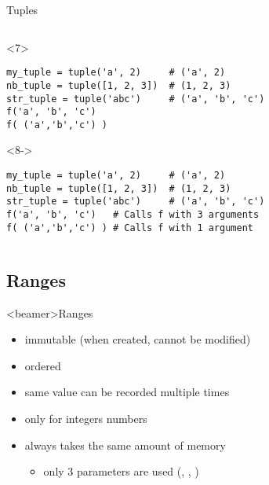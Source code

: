 \begin{frame}[fragile]{Tuples}
\begin{center}
\begin{columns}[onlytextwidth]
\begin{column}{\textwidth}
      \begin{onlyenv}<7>
        \begin{lstlisting}[style=python,morekeywords={for, in, range, list}]
my_tuple = tuple('a', 2)     # ('a', 2)
nb_tuple = tuple([1, 2, 3])  # (1, 2, 3)
str_tuple = tuple('abc')     # ('a', 'b', 'c')
f('a', 'b', 'c')
f( ('a','b','c') ) \end{lstlisting}
      \end{onlyenv}

      \begin{onlyenv}<8->
        \begin{lstlisting}[style=python,morekeywords={for, in, range, list}]
my_tuple = tuple('a', 2)     # ('a', 2)
nb_tuple = tuple([1, 2, 3])  # (1, 2, 3)
str_tuple = tuple('abc')     # ('a', 'b', 'c')
f('a', 'b', 'c')   # Calls f with 3 arguments
f( ('a','b','c') ) # Calls f with 1 argument \end{lstlisting}
      \end{onlyenv}

    \end{column}
  \end{columns}

  \end{center}

\end{frame}



\subsection{Ranges}

\begin{frame}<beamer>{Ranges}

  \begin{itemize}
    \item<1-> immutable (when created, cannot be modified)
    \item<2-> ordered
    \item<3-> same value can be recorded multiple times
    \item<4-> only for integers numbers
    \item<5-> always takes the same amount of memory
    \begin{itemize}
      \item<6-> only 3 parameters are used (, , )
    \end{itemize}
  \end{itemize}

\end{frame}


